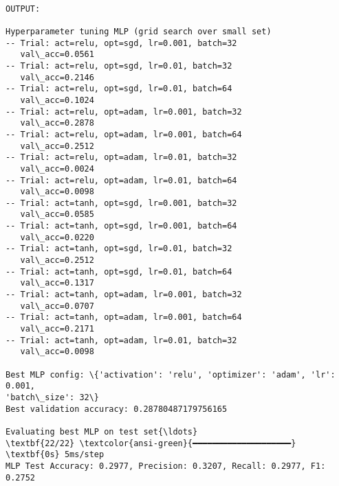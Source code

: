 \documentclass[11pt]{article}
\begin{document}
    \begin{Verbatim}[commandchars=\\\{\}]

OUTPUT:

Hyperparameter tuning MLP (grid search over small set)
-- Trial: act=relu, opt=sgd, lr=0.001, batch=32
   val\_acc=0.0561
-- Trial: act=relu, opt=sgd, lr=0.01, batch=32
   val\_acc=0.2146
-- Trial: act=relu, opt=sgd, lr=0.01, batch=64
   val\_acc=0.1024
-- Trial: act=relu, opt=adam, lr=0.001, batch=32
   val\_acc=0.2878
-- Trial: act=relu, opt=adam, lr=0.001, batch=64
   val\_acc=0.2512
-- Trial: act=relu, opt=adam, lr=0.01, batch=32
   val\_acc=0.0024
-- Trial: act=relu, opt=adam, lr=0.01, batch=64
   val\_acc=0.0098
-- Trial: act=tanh, opt=sgd, lr=0.001, batch=32
   val\_acc=0.0585
-- Trial: act=tanh, opt=sgd, lr=0.001, batch=64
   val\_acc=0.0220
-- Trial: act=tanh, opt=sgd, lr=0.01, batch=32
   val\_acc=0.2512
-- Trial: act=tanh, opt=sgd, lr=0.01, batch=64
   val\_acc=0.1317
-- Trial: act=tanh, opt=adam, lr=0.001, batch=32
   val\_acc=0.0707
-- Trial: act=tanh, opt=adam, lr=0.001, batch=64
   val\_acc=0.2171
-- Trial: act=tanh, opt=adam, lr=0.01, batch=32
   val\_acc=0.0098

Best MLP config: \{'activation': 'relu', 'optimizer': 'adam', 'lr': 0.001,
'batch\_size': 32\}
Best validation accuracy: 0.28780487179756165

Evaluating best MLP on test set{\ldots}
\textbf{22/22} \textcolor{ansi-green}{━━━━━━━━━━━━━━━━━━━━} \textbf{0s} 5ms/step
MLP Test Accuracy: 0.2977, Precision: 0.3207, Recall: 0.2977, F1: 0.2752
    \end{Verbatim}

    \begin{center}
    \end{center}
    { \hspace*{\fill} \\}
    
\end{document}
